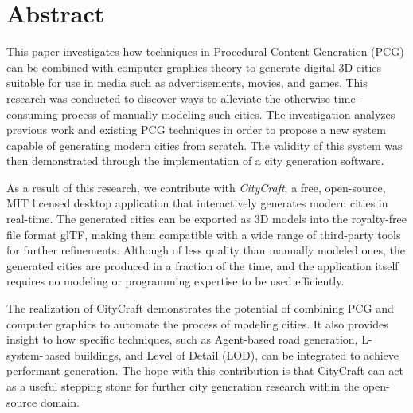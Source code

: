 \chapter*{Abstract}

This paper investigates how techniques in Procedural Content Generation (PCG) can be combined with computer graphics theory to generate digital 3D cities suitable for use in media such as advertisements, movies, and games.
This research was conducted to discover ways to alleviate the otherwise time-consuming process of manually modeling such cities.
The investigation analyzes previous work and existing PCG techniques in order to propose a new system capable of generating modern cities from scratch. 
The validity of this system was then demonstrated through the implementation of a city generation software.

As a result of this research, we contribute with \textit{CityCraft}; a free, open-source, MIT licensed desktop application that interactively generates modern cities in real-time.
The generated cities can be exported as 3D models into the royalty-free file format glTF, making them compatible with a wide range of third-party tools for further refinements.
Although of less quality than manually modeled ones, the generated cities are produced in a fraction of the time, and the application itself requires no modeling or programming expertise to be used efficiently.

The realization of CityCraft demonstrates the potential of combining PCG and computer graphics to automate the process of modeling cities.
It also provides insight to how specific techniques, such as Agent-based road generation, L-system-based buildings, and Level of Detail (LOD), can be integrated to achieve performant generation.
The hope with this contribution is that CityCraft can act as a useful stepping stone for further city generation research within the open-source domain.